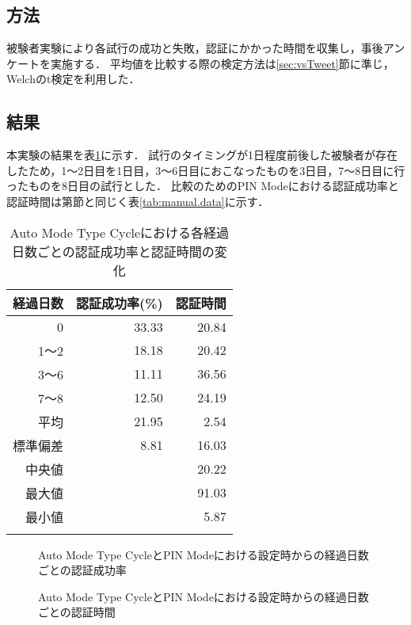 \subsection{方法}
被験者実験により各試行の成功と失敗，認証にかかった時間を収集し，事後アンケートを実施する．
平均値を比較する際の検定方法は\ref{sec:vsTweet}節に準じ，Welchのt検定を利用した．

\subsection{結果}
本実験の結果を表\ref{tab:auto_cycle.data}に示す．
試行のタイミングが1日程度前後した被験者が存在したため，1〜2日目を1日目，3〜6日目におこなったものを3日目，7〜8日目に行ったものを8日目の試行とした．
比較のためのPIN Modeにおける認証成功率と認証時間は第\label{sec:vsManual}節と同じく表\ref{tab:manual.data}に示す．
\begin{table}[ht]
  \caption{Auto Mode Type Cycleにおける各経過日数ごとの認証成功率と認証時間の変化}
  \label{tab:auto_cycle.data}
  \begin{center}
    \small
    \begin{tabular}{rrr}
      \bhline
      経過日数 & 認証成功率(\%) & 認証時間\\ \hline
      0 & 33.33 & 20.84 \\
      1〜2 & 18.18 & 20.42 \\
      3〜6 & 11.11 & 36.56 \\
      7〜8 & 12.50 & 24.19 \\ \hline \hline
      平均 & 21.95 & 2.54 \\
      標準偏差 & 8.81 & 16.03 \\
      中央値 & & 20.22 \\
      最大値 & & 91.03 \\
      最小値 & & 5.87 \\
      \bhline
    \end{tabular}
  \end{center}
\end{table}

\begin{figure}[t]
  \begin{center}
  \end{center}
  \caption{Auto Mode Type CycleとPIN Modeにおける設定時からの経過日数ごとの認証成功率}
  \label{fig:ex_auto_cycle_vs_pin_rate}
\end{figure}

\begin{figure}[b]
  \begin{center}
  \end{center}
  \caption{Auto Mode Type CycleとPIN Modeにおける設定時からの経過日数ごとの認証時間}
  \label{fig:ex_auto_cycle_vs_pin_time}
\end{figure}

